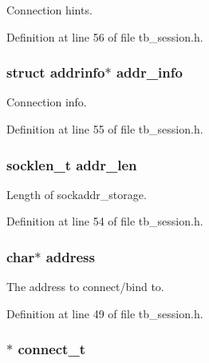 Connection hints. 



Definition at line 56 of file tb\-\_\-session.\-h.

\hypertarget{structtb__session__t_aab742bc33815bd69bf49ad1861006b97}{
\subsubsection[{addr\-\_\-info}]{\setlength{\rightskip}{0pt plus 5cm}struct addrinfo$\ast$ addr\-\_\-info}}\label{structtb__session__t_aab742bc33815bd69bf49ad1861006b97}


Connection info. 



Definition at line 55 of file tb\-\_\-session.\-h.

\hypertarget{structtb__session__t_a116941d922ae354d7241d04b0f3c84d8}{
\subsubsection[{addr\-\_\-len}]{\setlength{\rightskip}{0pt plus 5cm}socklen\-\_\-t addr\-\_\-len}}\label{structtb__session__t_a116941d922ae354d7241d04b0f3c84d8}


Length of sockaddr\-\_\-storage. 



Definition at line 54 of file tb\-\_\-session.\-h.

\hypertarget{structtb__session__t_a879a8cdf605d02f8af8b2e216b8764f2}{
\subsubsection[{address}]{\setlength{\rightskip}{0pt plus 5cm}char$\ast$ address}}\label{structtb__session__t_a879a8cdf605d02f8af8b2e216b8764f2}


The address to connect/bind to. 



Definition at line 49 of file tb\-\_\-session.\-h.

\hypertarget{structtb__session__t_a49678949e63fd3a8335bac2bfa9d9ff2}{
\subsubsection[{connect\-\_\-t}]{$\ast$ connect\-\_\-t}}\label{structtb__session__t_a49678949e63fd3a8335bac2bfa9d9ff2}


